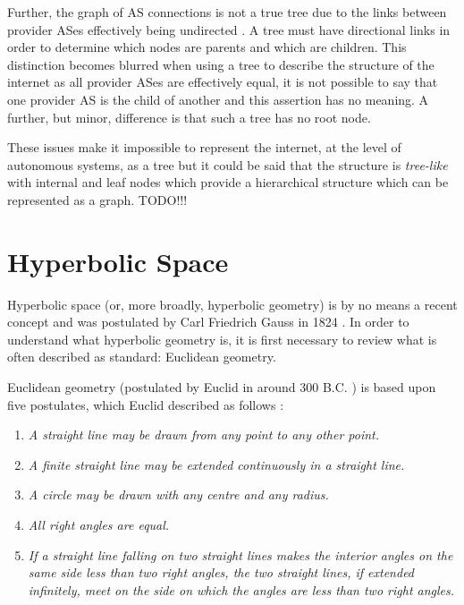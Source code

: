 Further, the graph of AS connections is not a true tree due to the links between provider ASes effectively being undirected \cite{di_battista_computing_2003}. A tree must have directional links in order to determine which nodes are parents and which are children. This distinction becomes blurred when using a tree to describe the structure of the internet as all provider ASes are effectively equal, it is not possible to say that one provider AS is the child of another and this assertion has no meaning. A further, but minor, difference is that such a tree has no root node. 

These issues make it impossible to represent the internet, at the level of autonomous systems, as a tree but it could be said that the structure is \textit{tree-like} with internal and leaf nodes which provide a hierarchical structure which can be represented as a graph. TODO!!!

\section{Hyperbolic Space}
\label{sec:LitReviewHyperbolicSpace}

Hyperbolic space (or, more broadly, hyperbolic geometry) is by no means a recent concept and was postulated by Carl Friedrich Gauss in 1824 \cite{ratcliffe_foundations_2006}. In order to understand what hyperbolic geometry is, it is first necessary to review what is often described as standard: Euclidean geometry.

Euclidean geometry (postulated by Euclid in around 300 B.C. \cite{ratcliffe_foundations_2006}) is based upon five postulates, which Euclid described as follows \cite{ratcliffe_foundations_2006}:
\begin{enumerate}
\item \textit{A straight line may be drawn from any point to any other point.}
\item \textit{A finite straight line may be extended continuously in a straight line.}
\item \textit{A circle may be drawn with any centre and any radius.}
\item \textit{All right angles are equal.}
\item \textit{If a straight line falling on two straight lines makes the interior angles on the same side less than two right angles, the two straight lines, if extended infinitely, meet on the side on which the angles are less than two right angles.}
\end{enumerate}

